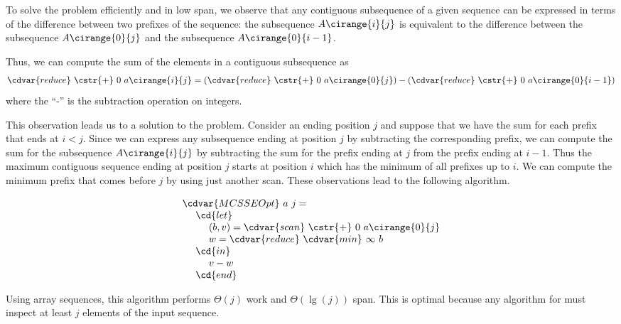 \begin{algorithm}
\label{alg:mcss::reduction:mcsse}
To solve the \MCSSE{} problem efficiently and in low span, we observe
that any contiguous subsequence of a given sequence can be expressed
in terms of the difference between two prefixes of the sequence:
%
the subsequence $A\cirange{i}{j}$ is equivalent to the difference
between the subsequence $A\cirange{0}{j}$ and the subsequence
$A\cirange{0}{i-1}$.
%

Thus, we can compute the sum of the elements in
a contiguous subsequence as
\[
\cdvar{reduce}~\cstr{+}~0~a\cirange{i}{j}
= 
\left(\cdvar{reduce}~\cstr{+}~0~a\cirange{0}{j}\right)
- 
\left(\cdvar{reduce}~\cstr{+}~0~a\cirange{0}{i-1}\right)
\]
where the ``-'' is the subtraction operation on integers.

This observation leads us to a solution to the \MCSSE{} problem.
%
Consider an ending position $j$ and suppose that we have
the sum for each prefix that ends at $i < j$.
%
Since we can express any subsequence ending at position $j$ by
subtracting the corresponding prefix, we can compute the sum for the
subsequence $A\cirange{i}{j}$ by subtracting the sum for the prefix
ending at $j$ from the prefix ending at $i-1$.
%
Thus the maximum contiguous sequence ending at position $j$ starts at
position $i$ which has the minimum of all prefixes up to $i$.
%
%
We can compute the minimum prefix that comes before $j$ by using just
another scan.  
%
These observations lead to the following algorithm.
%

\[
\begin{array}{l}
\cdvar{MCSSEOpt}~a~j=
\\
~~~~\cd{let}
\\
~~~~~~~~(b,v) = \cdvar{scan}~\cstr{+}~0~a\cirange{0}{j}
\\
~~~~~~~~w= \cdvar{reduce}~\cdvar{min}~\infty~b
\\
~~~~\cd{in}
\\
~~~~~~~~v - w 
\\
~~~~\cd{end}
\end{array}
\]

Using array sequences, this algorithm performs $\Theta(j)$ work and
$\Theta(\lg (j))$ span.  This is optimal because any algorithm for \MCSSE{} must inspect at least $j$ elements of the input sequence.  
\end{algorithm}
%



